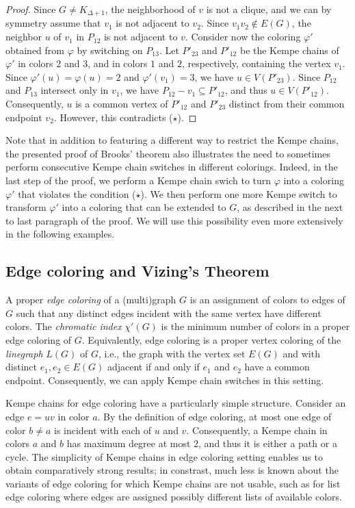 \documentclass[12pt,twoside,openright,a4paper]{book}
\begin{document}
\begin{proof}
Since $G\neq K_{\Delta+1}$, the neighborhood of $v$ is not a clique, and we can by symmetry assume that $v_1$
is not adjacent to $v_2$.  Since $v_1v_2\not\in E(G)$, the neighbor $u$ of $v_1$ in $P_{12}$
is not adjacent to $v$.  Consider now the coloring $\varphi'$ obtained from $\varphi$ by
switching on $P_{13}$.  Let $P'_{23}$ and $P'_{12}$ be the Kempe chains of $\varphi'$ in colors $2$ and $3$, and in colors $1$ and $2$,
respectively, containing the vertex $v_1$.  Since $\varphi'(u)=\varphi(u)=2$ and $\varphi'(v_1)=3$, we have $u\in V(P'_{23})$.
Since $P_{12}$ and $P_{13}$ intersect only in $v_1$, we have $P_{12}-v_1\subseteq P'_{12}$, and thus $u\in V(P'_{12})$.
Consequently, $u$ is a common vertex of $P'_{12}$ and $P'_{23}$ distinct from their common endpoint $v_2$.  However, this contradicts ($\star$).
\end{proof}

Note that in addition to featuring a different way to restrict the Kempe chains, the presented proof of Brooks' theorem
also illustrates the need to sometimes perform consecutive Kempe chain switches in different colorings.  Indeed, in the last step of the
proof, we perform a Kempe chain swich to turn $\varphi$ into a coloring $\varphi'$ that violates the condition ($\star$).
We then perform one more Kempe switch to transform $\varphi'$ into a coloring that can be extended to $G$, as described in the
next to last paragraph of the proof.  We will use this possibility even more extensively in the following examples.

\subsection{Edge coloring and Vizing's Theorem}

A proper \emph{edge coloring} of a (multi)graph $G$ is an assignment of colors to edges of $G$ such that any
distinct edges incident with the same vertex have different colors.  The \emph{chromatic index} $\chi'(G)$
is the minimum number of colors in a proper edge coloring of $G$.  Equivalently, edge coloring is a proper vertex coloring
of the \emph{linegraph} $L(G)$ of $G$, i.e., the graph with the vertex set $E(G)$ and with distinct $e_1,e_2\in E(G)$
adjacent if and only if $e_1$ and $e_2$ have a common endpoint.  Consequently, we can apply Kempe chain switches
in this setting.

Kempe chains for edge coloring have a particularly simple structure.  Consider an edge $e=uv$ in color $a$.
By the definition of edge coloring, at most one edge of color $b\neq a$ is incident with each of $u$ and $v$.
Consequently, a Kempe chain in colors $a$ and $b$ has maximum degree at most $2$, and thus it is either a path or a cycle.
The simplicity of Kempe chains in edge coloring setting enables us to obtain comparatively strong results;
in constrast, much less is known about the variants of edge coloring for which Kempe chains are not usable,
such as for list edge coloring where edges are assigned possibly different lists of available colors.
\end{document}

